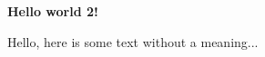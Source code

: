 \documentclass[../main.tex]{subfiles}
\begin{document}
\textbf{Hello world 2!}

Hello, here is some text without a meaning...
\end{document}
